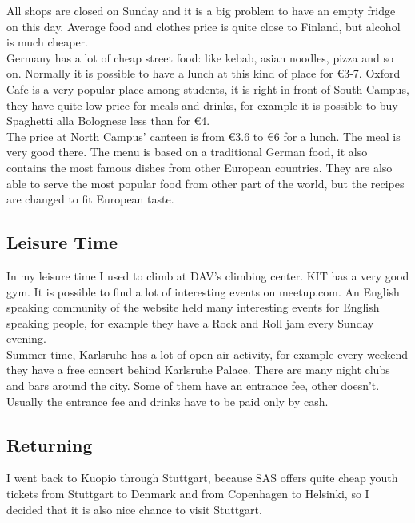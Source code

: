 \documentclass[english]{article}
\begin{document}
All shops are closed on Sunday and it is a big problem to have an empty fridge on this day. Average food and clothes price is quite close to Finland, but alcohol is much cheaper.\\

Germany has a lot of cheap street food: like kebab, asian noodles, pizza and so on. Normally it is possible to have a lunch at this kind of place for \euro3-7. Oxford Cafe is a very popular place among students, it is right in front of South Campus, they have quite low price for meals and drinks, for example it is possible to buy Spaghetti alla Bolognese less than for \euro4.\\

The price at North Campus’ canteen is from \euro3.6 to \euro6 for a lunch. The meal is very good there. The menu is based on a traditional German food, it also contains the most famous dishes from other European countries. They are also able to serve the most popular food from other part of the world, but the recipes are changed to fit European taste.

\subsection{Leisure Time}

In my leisure time I used to climb at DAV's climbing center. KIT has a very good gym. It is possible to find a lot of interesting events on meetup.com. An English speaking community of the website held many interesting events for English speaking people, for example they have a Rock and Roll jam every Sunday evening. \\

Summer time, Karlsruhe has a lot of open air activity, for example every weekend they have a free concert behind Karlsruhe Palace. There are many night clubs and bars around the city. Some of them have an entrance fee, other doesn't. Usually the entrance fee and drinks have to be paid only by cash. \\

\subsection{Returning}

I went back to Kuopio through Stuttgart, because SAS offers quite cheap youth tickets from Stuttgart to Denmark and from Copenhagen to Helsinki, so I decided that it is also nice chance to visit Stuttgart. \\
\end{document}
